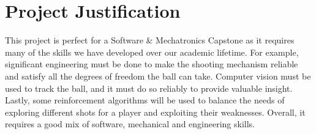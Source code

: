 \documentclass[11pt, oneside]{article}
\begin{document}
\section*{Project Justification}
This project is perfect for a Software \& Mechatronics Capstone as it requires many of the skills we have developed over our academic lifetime. For example, significant engineering must be done to make the shooting mechanism reliable and satisfy all the degrees of freedom the ball can take. Computer vision must be used to track the ball, and it must do so reliably to provide valuable insight. Lastly, some reinforcement algorithms will be used to balance the needs of exploring different shots for a player and exploiting their weaknesses. Overall, it requires a good mix of software, mechanical and engineering skills.
\end{document}
